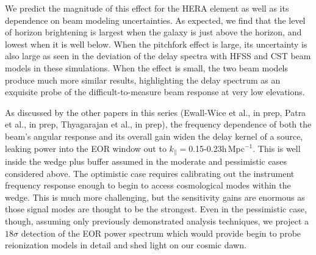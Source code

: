 \documentclass{emulateapj}
\begin{document}
We predict the magnitude of this effect for the HERA element as well as its dependence on beam modeling uncertainties. As expected, we find that the level of horizon brightening is largest when the galaxy is just above the horizon, and lowest when it is well below. When the pitchfork effect is large, its uncertainty is also large as seen in the deviation of the delay spectra with HFSS and CST beam models in these simulations. When the effect is small, the two beam models produce much more similar results, highlighting the delay spectrum as an exquisite probe of the difficult-to-measure beam response at very low elevations. 

As discussed by the other papers in this series (Ewall-Wice et al., in prep, Patra et al., in prep, Thyagarajan et al., in prep), the frequency dependence of both the beam's angular response and its overall gain widen the delay kernel of a source, leaking power into the EOR window out to $k_\parallel=$0.15-0.23h\,Mpc$^{-1}$. This is well inside the wedge plus buffer assumed in the moderate and pessimistic cases considered above. The optimistic case requires calibrating out the instrument frequency response enough to begin to access cosmological modes within the wedge. This is much more challenging, but the sensitivity gains are enormous as those signal modes are thought to be the strongest. Even in the pessimistic case, though, assuming only previously demonstrated analysis techniques, we project a $18\sigma$ detection of the EOR power spectrum which would provide begin to probe reionization models in detail and shed light on our cosmic dawn. 





\end{document}
